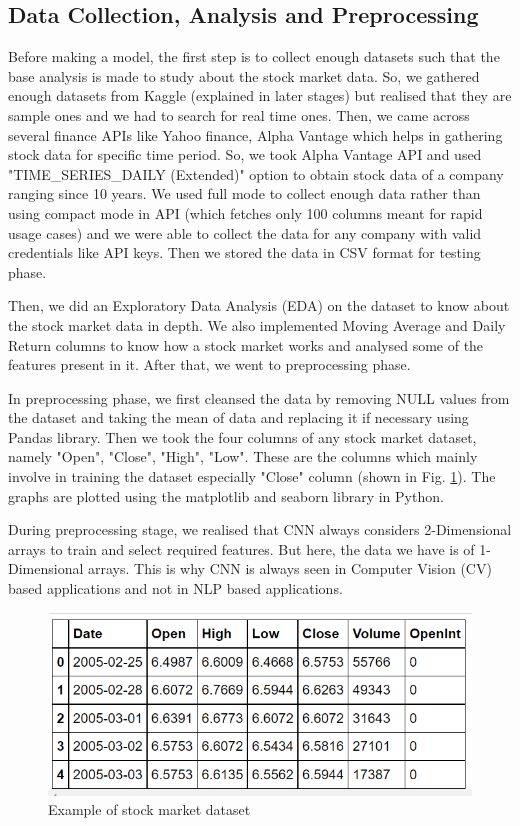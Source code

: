 \documentclass[conference]{IEEEtran}
\begin{document}
\subsection{Data Collection, Analysis and Preprocessing}\label{A}
Before making a model, the first step is to collect enough datasets such that the base analysis is made to study about the stock market data. So, we gathered enough datasets from Kaggle (explained in later stages) but realised that they are sample ones and we had to search for real time ones. Then, we came across several finance APIs like Yahoo finance, Alpha Vantage which helps in gathering stock data for specific time period. So, we took Alpha Vantage API and used "TIME\_SERIES\_DAILY (Extended)" option to obtain stock data of a company ranging since 10 years. We used full mode to collect enough data rather than using compact mode in API (which fetches only 100 columns meant for rapid usage cases) and we were able to collect the data for any company with valid credentials like API keys. Then we stored the data in CSV format for testing phase.

Then, we did an Exploratory Data Analysis (EDA) on the dataset to know about the stock market data in depth. We also implemented Moving Average and Daily Return columns to know how a stock market works and analysed some of the features present in it. After that, we went to preprocessing phase.

In preprocessing phase, we first cleansed the data by removing NULL values from the dataset and taking the mean of data and replacing it if necessary using Pandas library. Then we took the four columns of any stock market dataset, namely "Open", "Close", "High", "Low". These are the columns which mainly involve in training the dataset especially "Close" column (shown in Fig. \ref{dataset-1}). The graphs are plotted using the matplotlib and seaborn library in Python. 

During preprocessing stage, we realised that CNN always considers 2-Dimensional arrays to train and select required features. But here, the data we have is of 1-Dimensional arrays. This is why CNN is always seen in Computer Vision (CV) based applications and not in NLP based applications. 

\begin{figure}[htbp]
\centerline{\includegraphics[scale=0.7]{Annotation-1.png}}
\caption{Example of stock market dataset}
\label{dataset-1}
\end{figure}
\end{document}
